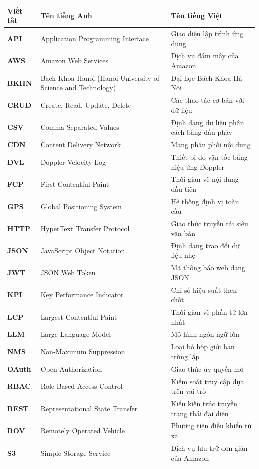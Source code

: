 \documentclass[../DoAn.tex]{subfiles}
\begin{document}
\begin{longtable}{l p{6.5cm} p{6.5cm}}
	\hline
   \textbf{Viết tắt}  & \textbf{Tên tiếng Anh} & \textbf{Tên tiếng Việt} \\ \hline
	\textbf{API} & Application Programming Interface & Giao diện lập trình ứng dụng \\
	\textbf{AWS} & Amazon Web Services & Dịch vụ đám mây của Amazon \\
	\textbf{BKHN} & Bach Khoa Hanoi (Hanoi University of Science and Technology) & Đại học Bách Khoa Hà Nội \\
	\textbf{CRUD} & Create, Read, Update, Delete & Các thao tác cơ bản với dữ liệu \\
	\textbf{CSV} & Comma-Separated Values & Định dạng dữ liệu phân cách bằng dấu phẩy \\
	\textbf{CDN} & Content Delivery Network & Mạng phân phối nội dung \\
	\textbf{DVL} & Doppler Velocity Log & Thiết bị đo vận tốc bằng hiệu ứng Doppler \\
	\textbf{FCP} & First Contentful Paint & Thời gian vẽ nội dung đầu tiên \\
	\textbf{GPS} & Global Positioning System & Hệ thống định vị toàn cầu \\
	\textbf{HTTP} & HyperText Transfer Protocol & Giao thức truyền tải siêu văn bản \\
	\textbf{JSON} & JavaScript Object Notation & Định dạng trao đổi dữ liệu nhẹ \\
	\textbf{JWT} & JSON Web Token & Mã thông báo web dạng JSON \\
	\textbf{KPI} & Key Performance Indicator & Chỉ số hiệu suất then chốt \\
	\textbf{LCP} & Largest Contentful Paint & Thời gian vẽ phần tử lớn nhất \\
	\textbf{LLM} & Large Language Model & Mô hình ngôn ngữ lớn \\
	\textbf{NMS} & Non-Maximum Suppression & Loại bỏ hộp giới hạn trùng lặp \\
	\textbf{OAuth} & Open Authorization & Giao thức ủy quyền mở \\
	\textbf{RBAC} & Role-Based Access Control & Kiểm soát truy cập dựa trên vai trò \\
	\textbf{REST} & Representational State Transfer & Kiểu kiến trúc truyền trạng thái đại diện \\
	\textbf{ROV} & Remotely Operated Vehicle & Phương tiện điều khiển từ xa \\
	\textbf{S3} & Simple Storage Service & Dịch vụ lưu trữ đơn giản của Amazon \\

\end{longtable}
\end{document}
